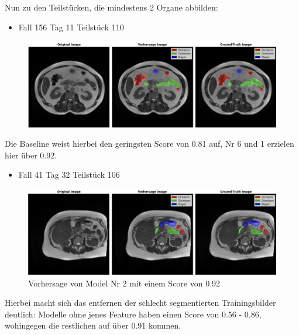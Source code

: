 Nun zu den Teilstücken, die mindestens 2 Organe abbilden:

\begin{itemize}
\item Fall 156 Tag 11 Teilstück 110
\end{itemize}

\begin{figure}[H]
	\begin{center}
		\includegraphics[width=400pt]{LaTex/bilder/case156_day11_slice_0110.png}
		\caption{  }\label{Fig:7vs1}
	\end{center}
\end{figure}

Die Baseline weist hierbei den geringsten Score von 0.81 auf, Nr 6 und 1 erzielen hier über 0.92.

\pagebreak

\begin{itemize}
\item Fall 41 Tag 32 Teilstück 106
\end{itemize}

\begin{figure}[H]
	\begin{center}
		\includegraphics[width=400pt]{LaTex/bilder/case41_day32_slice_0106.png}
		\caption{ Vorhersage von Model Nr 2 mit einem Score von 0.92 }\label{Fig:analysis-clean-data}
	\end{center}
\end{figure}

Hierbei macht sich das entfernen der schlecht segmentierten Trainingsbilder deutlich: Modelle ohne jenes Feature haben einen Score von 0.56 - 0.86, wohingegen die restlichen auf über 0.91 kommen. 

